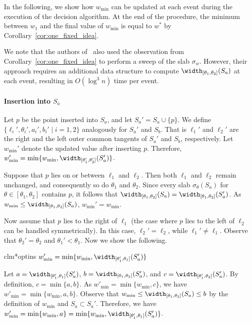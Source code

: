 In the following, we show how $w_{\min}$ can be updated at each event during the execution of the decision algorithm.
At the end of the procedure, the minimum between $w_1$ and the final value of $w_{\min}$ is equal to $w^*$ by Corollary~\ref{cor:one_fixed_idea}. 



We note that the authors of~\cite{ahn2024constrained} also used the observation from Corollary~\ref{cor:one_fixed_idea} to perform a sweep of the slab $\sigma_w$.
However, their approach requires an additional data structure to compute $\width_{[\theta_1, \theta_2]}(S_a)$ at each event, resulting in $O(\log^3 n)$ time per event.


\paragraph*{Insertion into $S_a$}
Let $p$ be the point inserted into $S_a$, and let $S_a' = S_a \cup \{p\}$.
We define $\{\ell_i', \theta_i', a_i', b_i' \mid i=1, 2 \}$ analogously for $S_a'$ and $S_b$. 
That is $\ell_1'$ and $\ell_2'$ are the right and the left outer common tangents of $S_a'$ and $S_b$, respectively. 
Let $w_{\min}'$ denote the updated value after inserting $p$.
Therefore, $w_{\min}' = \min \{w_{\min}, \width_{[\theta_1', \theta_2']}(S_a')\}$.


Suppose that $p$ lies on or between $\ell_1$ and $\ell_2$. 
Then both $\ell_1$ and $\ell_2$ remain unchanged, and consequently so do $\theta_1$ and $\theta_2$.
Since every slab $\sigma_\theta(S_a)$ for $\theta \in [\theta_1, \theta_2]$ contains $p$, it follows that $\width_{[\theta_1, \theta_2]}(S_a) = \width_{[\theta_1, \theta_2]}(S_a')$. 
As $w_{\min} \le \width_{[\theta_1, \theta_2]}(S_a)$, $w_{\min}' = w_{\min}$. 

Now assume that $p$ lies to the right of $\ell_1$ (the case where $p$ lies to the left of $\ell_2$ can be handled symmetrically).
In this case, $\ell_2' = \ell_2$, while $\ell_1' \neq \ell_1$.
Observe that $\theta_2' = \theta_2$ and $\theta_1' < \theta_1$.
Now we show the following. 

\begin{restatable}{clm*}{optins}
    \label{claim:opt_ins}
    $w_{\min}' = \min \{w_{\min}, \width_{[\theta_1', \theta_1]}(S_a') \}$
\end{restatable}



\begin{claimproof}
    Let $a = \width_{[\theta_1', \theta_1]}(S_a')$, 
    $b = \width_{[\theta_1, \theta_2]}(S_a')$, and
    $c = \width_{[\theta_1', \theta_2]}(S_a')$. 
    By definition, $c = \min \{ a, b\}$. 
    As $w'_{\min} = \min \{w_{\min}, c \}$, 
    we have $w'_{\min} = \min \{w_{\min}, a, b \}$. 
    Observe that $w_{\min} \le  \width_{[\theta_1, \theta_2]}(S_a) \le b$ by the definition of $w_{\min}$ and $S_a \subset S_a'$. 
    Therefore, we have $w'_{\min} = \min \{w_{\min}, a \} =  \min \{w_{\min}, \width_{[\theta_1', \theta_1]}(S_a')\}$.
\end{claimproof}



